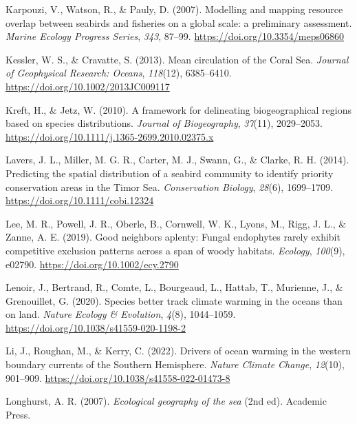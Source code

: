 \documentclass{article}
\newlength{\cslhangindent}
\newlength{\cslentryspacingunit} %
\newenvironment{CSLReferences}[2] %
 {%
  \setlength{\parindent}{0pt}
  \ifodd #1
  \let\oldpar\par
  \def\par{\hangindent=\cslhangindent\oldpar}
  \fi
  \setlength{\parskip}{#2\cslentryspacingunit}
 }%
 {}
\begin{document}
\begin{linenumbers}
\begin{CSLReferences}{1}{0}
\leavevmode{}%
Karpouzi, V., Watson, R., \& Pauly, D. (2007). Modelling and mapping resource overlap between seabirds and fisheries on a global scale: a preliminary assessment. \emph{Marine Ecology Progress Series}, \emph{343}, 87--99. \url{https://doi.org/10.3354/meps06860}

\leavevmode{}%
Kessler, W. S., \& Cravatte, S. (2013). Mean circulation of the Coral Sea. \emph{Journal of Geophysical Research: Oceans}, \emph{118}(12), 6385--6410. \url{https://doi.org/10.1002/2013JC009117}

\leavevmode{}%
Kreft, H., \& Jetz, W. (2010). A framework for delineating biogeographical regions based on species distributions. \emph{Journal of Biogeography}, \emph{37}(11), 2029--2053. \url{https://doi.org/10.1111/j.1365-2699.2010.02375.x}

\leavevmode{}%
Lavers, J. L., Miller, M. G. R., Carter, M. J., Swann, G., \& Clarke, R. H. (2014). Predicting the spatial distribution of a seabird community to identify priority conservation areas in the Timor Sea. \emph{Conservation Biology}, \emph{28}(6), 1699--1709. \url{https://doi.org/10.1111/cobi.12324}

\leavevmode{}%
Lee, M. R., Powell, J. R., Oberle, B., Cornwell, W. K., Lyons, M., Rigg, J. L., \& Zanne, A. E. (2019). Good neighbors aplenty: Fungal endophytes rarely exhibit competitive exclusion patterns across a span of woody habitats. \emph{Ecology}, \emph{100}(9), e02790. \url{https://doi.org/10.1002/ecy.2790}

\leavevmode{}%
Lenoir, J., Bertrand, R., Comte, L., Bourgeaud, L., Hattab, T., Murienne, J., \& Grenouillet, G. (2020). Species better track climate warming in the oceans than on land. \emph{Nature Ecology \& Evolution}, \emph{4}(8), 1044--1059. \url{https://doi.org/10.1038/s41559-020-1198-2}

\leavevmode{}%
Li, J., Roughan, M., \& Kerry, C. (2022). Drivers of ocean warming in the western boundary currents of the Southern Hemisphere. \emph{Nature Climate Change}, \emph{12}(10), 901--909. \url{https://doi.org/10.1038/s41558-022-01473-8}

\leavevmode{}%
Longhurst, A. R. (2007). \emph{Ecological geography of the sea} (2nd ed). Academic Press.


\end{CSLReferences}
\end{linenumbers}
\end{document}
